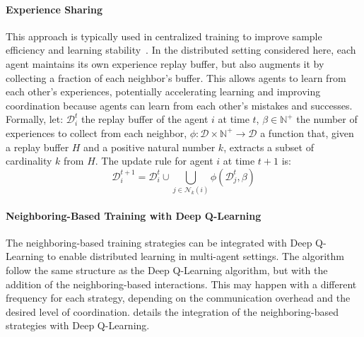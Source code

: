 \paragraph{Experience Sharing}
This approach is typically used in centralized training to improve sample efficiency 
 and learning stability~\cite{marl-book}.
%
In the distributed setting considered here, 
 each agent maintains its own experience replay buffer, 
 but also augments it by collecting a fraction of each neighbor's buffer.
%
This allows agents to learn from each other's experiences, 
 potentially accelerating learning and improving coordination because agents can learn from each other's mistakes 
 and successes.
%
Formally, let: 
 $\mathcal{D}^t_i$ the replay buffer of the agent $i$ at time $t$,
 $\beta \in \mathbb{N}^+ $ the number of experiences to collect from each neighbor,
 $\phi: \mathcal{D} \times \mathbb{N}^+ \to \mathcal{D}$ a function that, 
 given a replay buffer $H$ and a positive natural number $k$, 
 extracts a subset of cardinality $k$ from $H$.
%
The update rule for agent $i$ at time $t+1$ is:
\begin{equation}
   \mathcal{D}^{t+1}_i = \mathcal{D}^t_i \cup \bigcup_{j \in \mathcal{N}_k(i)} \phi(\mathcal{D}^t_j, \beta)
\end{equation}

\paragraph{Neighboring-Based Training with Deep Q-Learning}
The neighboring-based training strategies can be integrated with Deep Q-Learning 
 to enable distributed learning in multi-agent settings.
%
The algorithm follow the same structure as the Deep Q-Learning algorithm, 
 but with the addition of the neighboring-based interactions.
%
This may happen with a different frequency for each strategy, 
 depending on the communication overhead and the desired level of coordination.
%
 details the integration 
 of the neighboring-based strategies with Deep Q-Learning.

